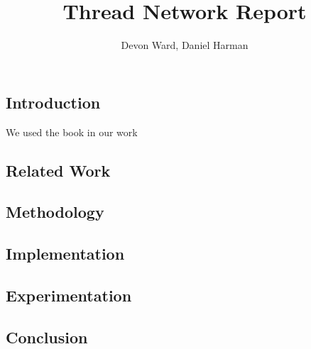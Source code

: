 \documentclass[letterpaper,twocolumn,10pt]{article}
\title{Thread Network Report}
\author{Devon Ward, Daniel Harman}
\begin{document}
\maketitle

\subsection*{Introduction}
We used the book \cite*{texbook} in our work
\subsection*{Related Work}

\subsection*{Methodology}

\subsection*{Implementation}

\subsection*{Experimentation}

\subsection*{Conclusion}

\printbibliography
\end{document}
